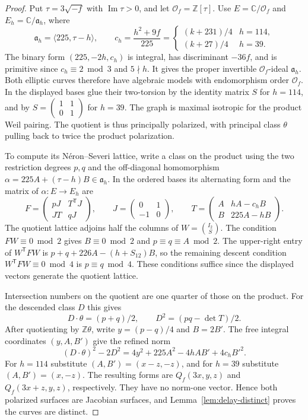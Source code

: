\documentclass[11pt,letterpaper]{amsart}
\theoremstyle{definition}
\numberwithin{equation}{section}
\newcommand{\Z}{\mathbb Z}
\newcommand{\C}{\mathbb C}
\newcommand{\OO}{\mathcal O}
\begin{document}
\begin{proof}
Put \(\tau=3\sqrt{-f}\) with \(\operatorname{Im}\tau>0\), and let
\(\OO_f=\Z[\tau]\). Use \(E=\C/\OO_f\) and
\(E_h=\C/\mathfrak a_h\), where
\[
 \mathfrak a_h=\langle225,\tau-h\rangle,\qquad
 c_h=\frac{h^2+9f}{225}=
 \begin{cases}
 (k+231)/4 & h=114,\\
 (k+27)/4 & h=39 .
 \end{cases}
\]
The binary form \((225,-2h,c_h)\) is integral, has discriminant
\(-36f\), and is primitive since \(c_h\equiv2\bmod3\) and \(5\nmid h\).
It gives the proper invertible \(\OO_f\)-ideal \(\mathfrak a_h\).
Both elliptic curves therefore have algebraic models with endomorphism
order \(\OO_f\). In the displayed bases glue their two-torsion by the
identity matrix \(S\) for \(h=114\), and by
\(S=\left(\begin{smallmatrix}1&1\\0&1\end{smallmatrix}\right)\) for
\(h=39\). The graph is maximal isotropic for the product Weil pairing.
The quotient is thus principally polarized, with principal class
\(\theta\) pulling back to twice the product polarization.

To compute its N\'eron--Severi lattice, write a class on the product
using the two restriction degrees \(p,q\) and the off-diagonal
homomorphism \(\alpha=225A+(\tau-h)B\in\mathfrak a_h\).
In the ordered bases its alternating form and the matrix of
\(\alpha:E\to E_h\) are
\[
 F=\begin{pmatrix}pJ&T^{\mathsf T}J\\JT&qJ\end{pmatrix},
 \qquad J=\begin{pmatrix}0&1\\-1&0\end{pmatrix},
 \qquad T=\begin{pmatrix}A&hA-c_h B\\ B&225A-hB\end{pmatrix}.
\]
The quotient lattice adjoins half the columns of
\(W=\binom{I_2}{S}\). The condition \(FW\equiv0\bmod2\) gives
\(B\equiv0\bmod2\) and \(p\equiv q\equiv A\bmod2\).
The upper-right entry of \(W^{\mathsf T}FW\) is
\(p+q+226A-(h+S_{12})B\), so the remaining descent condition
\(W^{\mathsf T}FW\equiv0\bmod4\) is \(p\equiv q\bmod4\).
These conditions suffice since the displayed vectors generate the
quotient lattice.

Intersection numbers on the quotient are one quarter of those on the
product. For the descended class \(D\) this gives
\[
 D\cdot\theta=(p+q)/2,\qquad D^2=(pq-\det T)/2.
\]
After quotienting by \(\Z\theta\), write \(y=(p-q)/4\) and \(B=2B'\).
The free integral coordinates \((y,A,B')\) give the refined norm
\[
 (D\cdot\theta)^2-2D^2
    =4y^2+225A^2-4hAB'+4c_h B'^2.
\]
For \(h=114\) substitute \((A,B')=(x-z,-z)\), and for \(h=39\)
substitute \((A,B')=(x,-z)\). The resulting forms are
\(Q_f(3x,y,z)\) and \(Q_f(3x+z,y,z)\), respectively.
They have no norm-one vector. Hence both polarized surfaces are
Jacobian surfaces, and Lemma~\ref{lem:delay-distinct} proves the curves
are distinct.


\end{proof}
\end{document}
